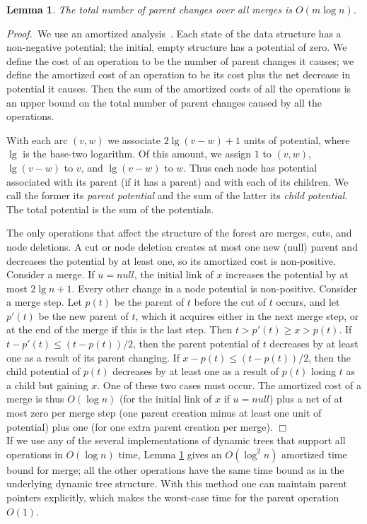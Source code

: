 \documentclass[twoside,leqno,twocolumn]{article}
\newtheorem{lemma}{Lemma}
\newcommand{\proof}{\noindent \emph{Proof.}\ }
\newcommand{\proofend}{$\Box$\\}
\newcommand{\nul}{\mathit{null}}
\begin{document}
\begin{lemma}
\label{lemma:dyn-trees}
The total number of parent changes over all merges is $O(m \log n)$.
\end{lemma}
\proof We use an amortized analysis~\cite{Tar85}.  Each state of the data structure has a non-negative potential; the initial, empty structure has a potential of zero.  We define the cost of an operation to be the number of parent changes it causes; we define the amortized cost of an operation to be its cost plus the net decrease in potential it causes.  Then the sum of the amortized costs of all the operations is an upper bound on the total number of parent changes caused by all the operations.

With each arc $(v, w)$ we associate $2 \lg (v - w) + 1$ units of potential, where $\lg$ is the base-two logarithm. Of this amount, we assign $1$ to $(v,w)$, $\lg (v-w)$ to $v$, and $\lg (v-w)$ to $w$.  Thus each node has potential associated with its parent (if it has a parent) and with each of its children.  We call the former its \emph{parent potential} and the sum of the latter its \emph{child potential}.  The total potential is the sum of the potentials.

The only operations that affect the structure of the forest are merges, cuts, and node deletions.  A cut or node deletion creates at most one new (null) parent and decreases the potential by at least one, so its amortized cost is non-positive. Consider a merge. If $u = \nul$, the initial link of $x$ increases the potential by at most $2\lg n + 1$. Every other change in a node potential is non-positive. Consider a merge step. Let $p(t)$ be the parent of $t$ before the cut of $t$ occurs, and let $p'(t)$ be the new parent of $t$, which it acquires either in the next merge step, or at the end of the merge if this is the last step.  Then $t > p'(t) \ge x > p(t)$.  If $t - p'(t) \le (t - p(t))/2$, then the parent potential of $t$ decreases by at least one as a result of its parent changing.  If $x - p(t) \le (t - p(t))/2$, then the child potential of $p(t)$ decreases by at least one as a result of $p(t)$ losing $t$ as a child but gaining $x$.  One of these two cases must occur. The amortized cost of a merge is thus $O(\log n)$ (for the initial link of $x$ if $u = \nul$) plus a net of at most zero per merge step (one parent creation minus at least one unit of potential) plus one (for one extra parent creation per merge).
\proofend

If we use any of the several implementations of dynamic trees that support all operations in $O(\log n)$ time, Lemma \ref{lemma:dyn-trees} gives an $O(\log^2 n)$ amortized time bound for merge; all the other operations have the same time bound as in the underlying dynamic tree structure.  With this method one can maintain parent pointers explicitly, which makes the worst-case time for the parent operation $O(1)$.
\end{document}
